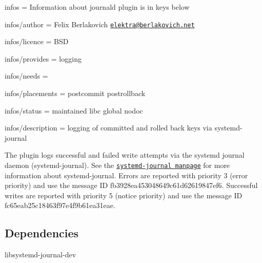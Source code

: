 
\begin{DoxyItemize}
\item infos = Information about journald plugin is in keys below
\item infos/author = Felix Berlakovich \href{mailto:elektra@berlakovich.net}{\tt elektra@berlakovich.\+net}
\item infos/licence = B\+S\+D
\item infos/provides = logging
\item infos/needs =
\item infos/placements = postcommit postrollback
\item infos/status = maintained libc global nodoc
\item infos/description = logging of committed and rolled back keys via systemd-\/journal
\end{DoxyItemize}

The plugin logs successful and failed write attempts via the systemd journal daemon (systemd-\/journal). See the \href{http://www.freedesktop.org/software/systemd/man/systemd-journald.service.html}{\tt systemd-\/journal manpage} for more information about systemd-\/journal. Errors are reported with priority 3 (error priority) and use the message I\+D {\ttfamily fb3928ea453048649c61d62619847ef6}. Successful writes are reported with priority 5 (notice priority) and use the message I\+D {\ttfamily fc65eab25c18463f97e4f9b61ea31eae}.

\subsection*{Dependencies}


\begin{DoxyItemize}
\item {\ttfamily libsystemd-\/journal-\/dev} 
\end{DoxyItemize}